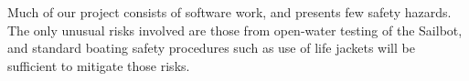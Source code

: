 Much of our project consists of software work, and presents few safety hazards.  The only unusual risks involved are those from open-water testing of the Sailbot, and standard boating safety procedures such as use of life jackets will be sufficient to mitigate those risks.